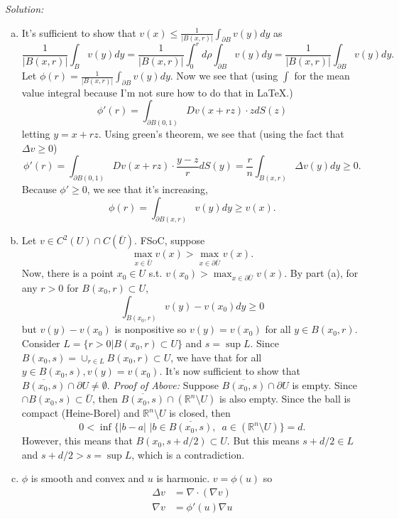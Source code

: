 \documentclass{article}
\newcommand{\R}{\mathbb{R}}
\begin{document}
    \textit{Solution:}
    \begin{enumerate}[(a)]
      \item It's sufficient to show that $v(x) \le \frac{1}{|B(x,r)|}\int_{\partial B} v(y)dy$ as 
      \[\frac{1}{|B(x,r)|}\int_{B} v(y)dy = \frac{1}{|B(x,r)|}\int_0^r d\rho\int_{\partial B} v(y)dy = \frac{1}{|B(x,r)|}\int_{\partial B} v(y)dy.\] Let $\phi(r) = \frac{1}{|B(x,r)|}\int_{\partial B} v(y)dy$. Now we see that (using $\int$ for the mean value integral because I'm not sure how to do that in LaTeX.)
      \[\phi'(r) = \int_{\partial B(0,1)} Dv(x+rz)\cdot zdS(z)\] letting $y = x+rz$. Using green's theorem, we see that (using the fact that $\Delta v \ge 0$)
      \[ \phi'(r) = \int_{\partial B(0,1)} Dv(x+rz)\cdot \frac{y-z}{r}dS(y) = \frac{r}{n}\int_{B(x,r)}\Delta v(y)dy \ge 0.\]
      Because $\phi' \ge 0$, we see that it's increasing,
      \[ \phi(r) = \int_{\partial B(x,r)}v(y)dy\ge v(x).\]
      \item Let $v \in C^2(U)\cap C(\bar{U})$. FSoC, suppose 
      \[\max_{x\in\bar{U}} v(x) > \max_{x\in\partial\bar{U}}v(x).\]
      Now, there is a point $x_0\in U$ s.t. $v(x_0) > \max_{x\in\partial\bar{U}}{v(x)}$.\newline
      By part (a), for any $r > 0$ for $B(x_0,r)\subset U$, 
      \[\int_{B(x_0,r)} v(y) - v(x_0)dy \ge 0\]
      but $v(y)-v(x_0)$ is nonpositive so $v(y)=v(x_0)$ for all $y\in B(x_0,r)$. Consider $L = \{r > 0|B(x_0,r)\subset U\}$ and $s=\sup{L}$. 
      Since $B(x_0,s)=\cup_{r\in L}B(x_0,r)\subset U$, we have that for all $y\in B(x_0,s),v(y)=v(x_0)$.\newline
      It's now sufficient to show that $\overline{B(x_0,s)}\cap \partial U\ne \emptyset$.\newline
      \textit{Proof of Above:} Suppose $\overline{B(x_0,s)}\cap \partial U$ is empty. Since $\cap{B(x_0,s)}\subset \bar{U}$, then $\overline{B(x_0,s)}\cap (\R^n\setminus U)$ is also empty.
      Since the ball is compact (Heine-Borel) and $\R^n\setminus U$ is closed, then 
      \[0 < \inf\{|b-a|\,\,|b\in \overline{B(x_0,s)},\,\,\,a\in(\R^n\setminus U)\} = d.\]
      However, this means that $B(x_0,s+d/2)\subset U$. But this means $s + d/2\in L$ and $s + d/2 > s = \sup{L}$, which is a contradiction.
    \item $\phi$ is smooth and convex and $u$ is harmonic. $v = \phi(u)$ so
    \begin{align*}
      \Delta v&= \nabla \cdot (\nabla v) \\
      \nabla v &= \phi'(u)\nabla u \\

\end{align*}
\end{enumerate}
\end{document}
